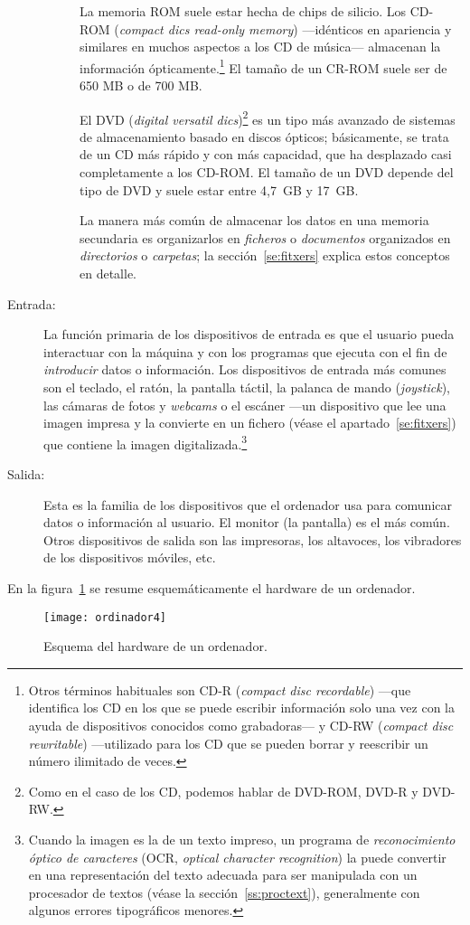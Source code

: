 \begin{description}
\begin{description}
La memoria ROM suele estar hecha de chips de silicio. Los CD-ROM (\emph{compact dics read-only memory}) ---idénticos en apariencia y similares en muchos aspectos a los CD de música--- almacenan la información ópticamente.\footnote{Otros términos habituales son CD-R (\emph{compact disc recordable}) ---que identifica los CD en los que se puede escribir información solo una vez con la ayuda de dispositivos conocidos como grabadoras--- y CD-RW (\emph{compact disc rewritable}) ---utilizado para los CD que se pueden borrar y reescribir un número ilimitado de veces.} El tamaño de un CR-ROM suele ser de 650 MB o de 700 MB. 

El DVD (\emph{digital versatil dics})\footnote{Como en el caso de los CD, podemos hablar de DVD-ROM, DVD-R y DVD-RW.} es un tipo más avanzado de sistemas de almacenamiento basado en discos ópticos; básicamente, se trata de un CD más rápido y con más capacidad, que ha desplazado casi completamente a los CD-ROM. El tamaño de un DVD depende del tipo de DVD y suele estar entre 4,7~GB y 17~GB. 

La manera más común de almacenar los datos en una memoria secundaria es organizarlos en {\em ficheros} o \emph{documentos} organizados en \emph{directorios} o \emph{carpetas}; la sección~\ref{se:fitxers} explica estos conceptos en detalle.\label{pg:menciofitxer} \end{description} 

\item[Entrada:] La función primaria de los dispositivos de entrada es que el usuario pueda interactuar con la máquina y con los programas que ejecuta con el fin de \emph{introducir} datos o información. Los dispositivos de entrada más comunes son el teclado, el ratón, la pantalla táctil, la palanca de mando (\emph{joystick}), las cámaras de fotos y \emph{webcams} o el escáner ---un dispositivo que lee una imagen impresa y la convierte en un fichero (véase el apartado~\ref{se:fitxers}) que contiene la imagen digitalizada.\footnote{Cuando la imagen es la de un texto impreso, un programa de \emph{reconocimiento óptico de caracteres} (OCR, \emph{optical character recognition}) la puede convertir en una representación del texto adecuada para ser manipulada con un procesador de textos (véase la sección~\ref{ss:proctext}), generalmente con algunos errores tipográficos menores.} 

\item[Salida:] Esta es la familia de los dispositivos que el ordenador usa para comunicar datos o información al usuario. El monitor (la pantalla) es el más común. Otros dispositivos de salida son las impresoras, los altavoces, los vibradores de los dispositivos móviles, etc. 

\end{description} En la figura~\ref{fg:ordinador} se resume esquemáticamente el hardware de un ordenador. \begin{figure} \centering

\texttt{[image: ordinador4]} \caption{Esquema del hardware de un ordenador.} \label{fg:ordinador} \end{figure} 

